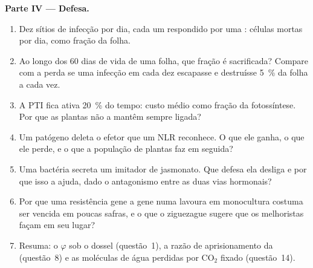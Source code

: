 \begin{problem}
\medskip
\noindent\textbf{Parte IV --- Defesa.}
\begin{enumerate}[resume]
  \item Dez sítios de infecção por dia, cada um respondido por uma
        : células mortas por dia, como fração da
        folha.
  \item Ao longo dos 60 dias de vida de uma folha, que fração é
        sacrificada? Compare com a perda se uma infecção em cada dez
        escapasse e destruísse \qty{5}{\%} da folha a cada vez.
  \item A PTI fica ativa \qty{20}{\%} do tempo: custo médio como fração
        da fotossíntese. Por que as plantas não a mantêm sempre ligada?
  \item Um patógeno deleta o efetor que um NLR reconhece. O que ele
        ganha, o que ele perde, e o que a população de plantas faz em
        seguida?
  \item Uma bactéria secreta um imitador de jasmonato. Que defesa ela
        desliga e por que isso a ajuda, dado o antagonismo entre as duas
        vias hormonais?
  \item Por que uma resistência gene a gene numa lavoura em monocultura
        costuma ser vencida em poucas safras, e o que o ziguezague sugere
        que os melhoristas façam em seu lugar?
  \item Resuma: o $\varphi$ sob o dossel (questão~1), a razão de
        aprisionamento da  (questão~8) e as moléculas de água
        perdidas por CO$_{2}$ fixado (questão~14).
\end{enumerate}
\end{problem}
